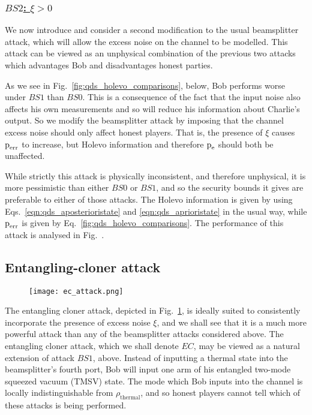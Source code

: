 \subsubsection{\underline{$BS2$: $\xi > 0$}}
We now introduce and consider a second modification to the usual beamsplitter attack, which will allow the excess noise on the channel to be modelled. This attack can be viewed as an unphysical combination of the previous two attacks which advantages Bob and disadvantages honest parties.

As we see in Fig.~\ref{fig:qds_holevo_comparisons}, below, Bob performs worse under $BS1$ than $BS0$. This is a consequence of the fact that the input noise also affects his own measurements and so will reduce his information about Charlie's output. So we modify the beamsplitter attack by imposing that the channel excess noise should only affect honest players. That is, the presence of $\xi$ causes $\text{p}_{\text{err}}$ to increase, but Holevo information and therefore $\text{p}_{\text{e}}$ should both be unaffected. 

While strictly this attack is physically inconsistent, and therefore unphysical, it is more pessimistic than either $BS0$ or $BS1$, and so the security bounds it gives are preferable to either of those attacks. The Holevo information is given by using Eqs.~\ref{eqn:qds_aposterioristate} and \ref{eqn:qds_aprioristate} in the usual way, while $\text{p}_{\text{err}}$ is given by Eq.~\ref{fig:qds_holevo_comparisons}. The performance of this attack is analysed in Fig.~.

\subsection{Entangling-cloner attack}
\begin{figure}[htp]
\centering
\texttt{[image: ec\_attack.png]}
\caption{\label{fig:ec_attack}}
\end{figure}
The entangling cloner attack, depicted in Fig.~\ref{fig:ec_attack}, is ideally suited to consistently incorporate the presence of excess noise $\xi$, and we shall see that it is a much more powerful attack than any of the beamsplitter attacks considered above. The entangling cloner attack, which we shall denote $EC$, may be viewed as a natural extension of attack $BS1$, above. Instead of inputting a thermal state into the beamsplitter's fourth port, Bob will input one arm of his entangled two-mode squeezed vacuum (TMSV) state. The mode which Bob inputs into the channel is locally indistinguishable from $\rho_{\text{thermal}}$, and so honest players cannot tell which of these attacks is being performed. 

